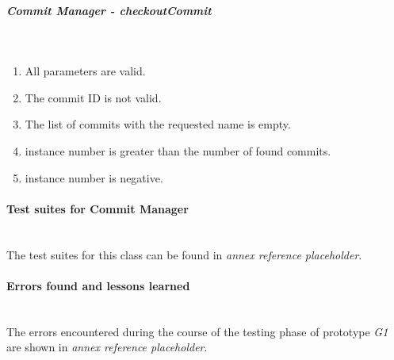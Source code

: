 \subparagraph{Commit Manager - checkoutCommit} \mbox{}\\
\begin{enumerate}
    \item All parameters are valid.
    \item The commit ID is not valid.
    \item The list of commits with the requested name is empty.
    \item instance number is greater than the number of found commits.
    \item instance number is negative.
\end{enumerate}

\paragraph{Test suites for Commit Manager}\mbox{}\\

The test suites for this class can be found in \emph{annex reference placeholder}. %

\paragraph{Errors found and lessons learned}\mbox{}\\

The errors encountered during the course of the testing phase of prototype \emph{G1} are shown in \emph{annex reference placeholder}. %

